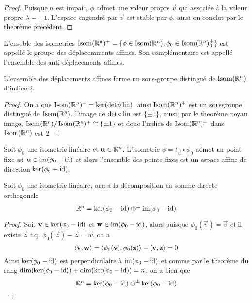 \begin{proof}
	Puisque $n$ est impair, $\phi$ admet une valeur propre $\vec{v}$ qui associée
	à la valeur propre $\lambda = \pm 1$. L'espace engendré par $\vec{v}$
	est stable par $\phi$, ainsi on conclut par le theorème précédent.	
\end{proof}

\begin{definition}
	L'enseble des isometries
	$\operatorname{Isom}(\mathbb{R}^n)^+ = \{\phi \in \operatorname{Isom}(\mathbb{R}^n), \phi_0 \in \operatorname{Isom}(\mathbb{R}^n)_0^+\}$
	est appellé le groupe des déplacemments affines.
	Son complémentaire est appellé l'ensemble des anti-déplacements affines.
\end{definition}

\begin{theorem}
	L'ensemble des déplacements affines forme un sous-groupe distingué de 
	$\operatorname{Isom}(\mathbb{R}^n)$ d'indice 2.
\end{theorem}

\begin{proof}
	On a que $\operatorname{Isom}(\mathbb{R}^n)^+ = \ker(\det \circ \operatorname{lin})$, ainsi $\operatorname{Isom}(\mathbb{R}^n)^+$
	est un sousgroupe distingué de $\operatorname{Isom}(\mathbb{R}^n)$.
	l'image de $\det \circ \operatorname{lin}$ est $\{ \pm 1 \}$, ainsi, par le theorème noyau
	image, $\operatorname{Isom}(\mathbb{R}^n)/\operatorname{Isom}(\mathbb{R}^n)^+ \cong \{ \pm 1\}$ et donc l'indice de
	$\operatorname{Isom}(\mathbb{R}^n)^+$ dans $\operatorname{Isom}(\mathbb{R}^n)$ est $2$.
\end{proof}

\begin{proposition}
	Soit $\phi_0$ une isometrie linéaire et $\mathbf{u} \in \mathbb{R}^n$. L'isometrie
	$\phi = t_{\vec{u}} \circ \phi_0$ admet un point fixe ssi $\mathbf{u} \in
	\operatorname{im}(\phi_0 - \operatorname{id})$ et alors l'ensemble des points fixes est un espace affine
	de direction $\ker(\phi_0 - \operatorname{id})$.
\end{proposition}

\begin{proposition}
	Soit $\phi_0$ une isometrie linéaire, ona a la décomposition en somme directe
	orthogonale
	\begin{equation*}
		\mathbb{R}^n = \ker(\phi_0 - \operatorname{id}) \oplus^\perp \operatorname{im}(\phi_0 - \operatorname{id})
	\end{equation*}
\end{proposition}

\begin{proof}
	Soit $\mathbf{v} \in \ker(\phi_0 - \operatorname{id})$ et $\mathbf{w} \in \operatorname{im}(\phi_0 - \operatorname{id})$,
	alors puisque $\phi_0(\vec{v}) = \vec{v}$ et il existe $\vec{z}$ t.q.
	$\phi_0(\vec{z}) - \vec{z} =\vec{w}$, on a
	\begin{equation*}
		\langle \mathbf{v}, \mathbf{w} \rangle = \langle \phi_0(\mathbf{v}), \phi_0(\mathbf{z}) \rangle
		- \langle \mathbf{v}, \mathbf{z} \rangle = 0
	\end{equation*}
	Ainsi $\ker(\phi_0 - \operatorname{id})$ est perpendiculaire à $\operatorname{im}(\phi_0 - \operatorname{id})$ et comme
	par le theorème du rang
	$\dim(\ker(\phi_0 - \operatorname{id})) + \dim(\ker(\phi_0 - \operatorname{id})) = n$, on a bien que
	\begin{equation*}
		\mathbb{R}^n = \ker(\phi_0 - \operatorname{id}) \oplus^\perp \ker(\phi_0 - \operatorname{id})
	\end{equation*}
\end{proof}

